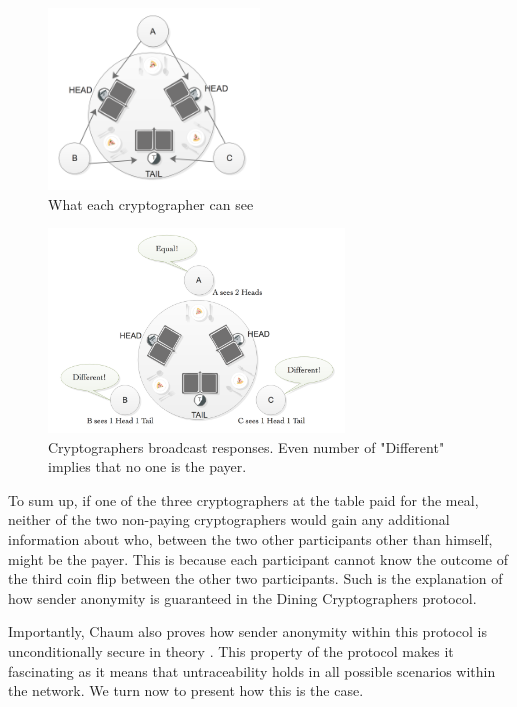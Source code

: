 \begin{figure}[h!]
    \centering
    \includegraphics[width=0.50\textwidth]{Images/DCstep2.png}
    \caption{What each cryptographer can see}
    \label{fig:dcstage2}
\end{figure}

\begin{figure}[h!]
    \centering
    \includegraphics[width=0.70\textwidth]{Images/DCstep3NoPayers.png}
    \caption{Cryptographers broadcast responses. Even number of "Different" implies that no one is the payer.}
    \label{fig:dcstage3}
\end{figure}

To sum up, if one of the three cryptographers at the table paid for the meal, neither of the two non-paying cryptographers would gain any additional information about who, between the two other participants other than himself, might be the payer. This is because each participant cannot know the outcome of the third coin flip between the other two participants.  Such is the explanation of how sender anonymity is guaranteed in the Dining Cryptographers protocol. 

Importantly, Chaum also proves how sender anonymity within this protocol is unconditionally secure in theory \cite{Chaum}. This property of the protocol makes it fascinating as it means that untraceability holds in all possible scenarios within the network.  We turn now to present how this is the case. 


